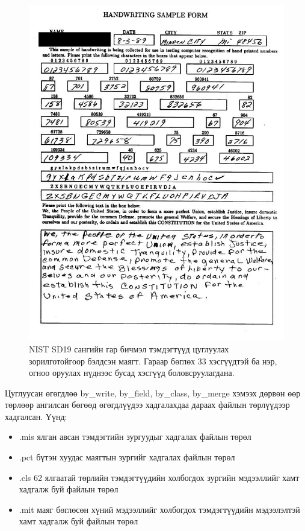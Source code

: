 \begin{figure}[h]
	\centering
	\includegraphics[scale=0.5]{"images/sd19.jpg"}
	\caption{NIST SD19 сангийн гар бичмэл тэмдэгтүүд цуглуулах зорилготойгоор бэлдсэн маягт. Гараар бөглөх 33 хэсгүүдтэй ба нэр, огноо оруулах нүднээс бусад хэсгүүд боловсруулагдана.}
	\label{fig:sd19}
\end{figure}

Цуглуусан өгөгдлөө by\_write, by\_field, by\_class, by\_merge хэмээх дөрвөн өөр төрлөөр ангилсан бөгөөд өгөгдлүүдээ хадгалахдаа дараах файлын төрлүүдээр хадгалсан. Үүнд:
\begin{itemize}
	\item .mis ялган авсан тэмдэгтийн зургуудыг хадгалах файлын төрөл
	\item .pct бүтэн хуудас маягтын зургийг хадгалах файлын төрөл
	\item .cls 62 ялгаатай төрлийн тэмдэгтүүдийн холбогдох зургийн мэдээллийг хамт хадгалж буй файлын төрөл
	\item .mit маяг бөглөсөн хүний мэдээллийг холбогдох тэмдэгтүүдийн мэдээлэлтэй хамт хадгалж буй файлын төрөл
\end{itemize}

